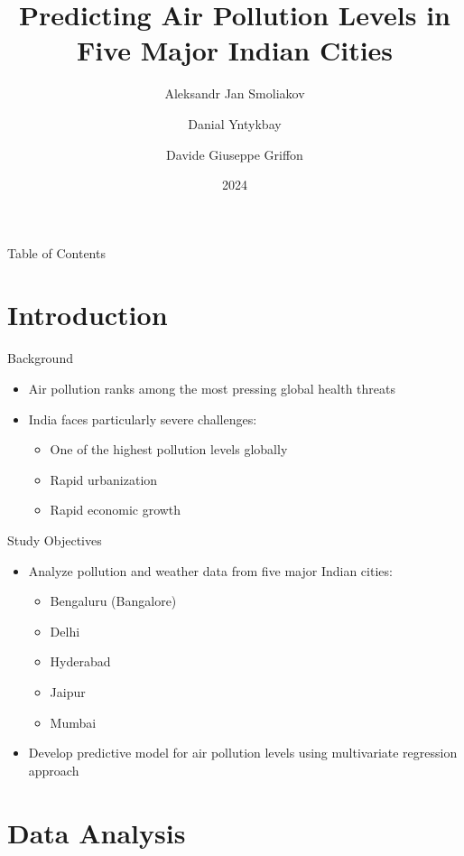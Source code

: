 \documentclass[svgnames, 10pt]{beamer}
\title[Air Pollution in India]{Predicting Air Pollution Levels in Five Major Indian Cities}
\author{Aleksandr Jan Smoliakov \and Danial Yntykbay \and Davide Giuseppe Griffon}
\institute[VU]{Data Science Study Programme\\Faculty of Mathematics and Informatics}
\date{2024}
\begin{document}
\begin{frame}
\titlepage
\end{frame}

\begin{frame}{Table of Contents}
\tableofcontents
\end{frame}

\section{Introduction}

\begin{frame}{Background}
    \begin{itemize}
        \item Air pollution ranks among the most pressing global health threats
        \item India faces particularly severe challenges:
            \begin{itemize}
                \item One of the highest pollution levels globally
                \item Rapid urbanization
                \item Rapid economic growth
            \end{itemize}
    \end{itemize}
    \end{frame}

\begin{frame}{Study Objectives}
\begin{itemize}
    \item Analyze pollution and weather data from five major Indian cities:
        \begin{itemize}
            \item Bengaluru (Bangalore)
            \item Delhi
            \item Hyderabad
            \item Jaipur
            \item Mumbai
        \end{itemize}
    \item Develop predictive model for air pollution levels using multivariate regression approach
\end{itemize}
\end{frame}

\section{Data Analysis}
\end{document}
